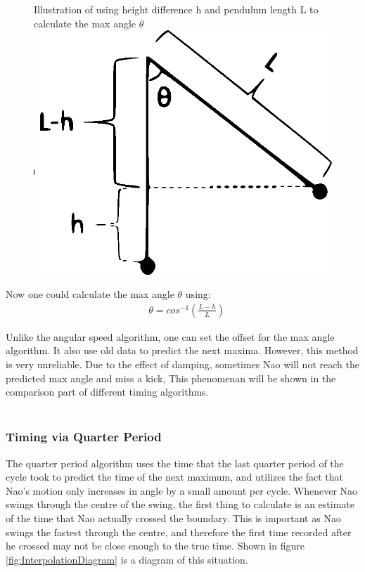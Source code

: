 \documentclass[11pt]{article}
\newcommand*\ruleline[1]{\par\noindent\raisebox{.8ex}{\makebox[\linewidth]{\hrulefill\hspace{1ex}\raisebox{-.8ex}{#1}\hspace{1ex}\hrulefill}}}
\begin{document}
    \begin{figure}[!htb]
        \centering
        \captionbox
             {Illustration of using height difference h and pendulum length L to calculate the max angle $\theta$\label{fig:max_angle_calculation}}
             {\includegraphics[scale = 0.85]{max_angle_calculation.eps}}
    \end{figure}
Now one could calculate the max angle $\theta$ using:
\begin{align}
    &\theta = cos^{-1}(\frac{L-h}{L})
\end{align}

Unlike the angular speed algorithm, one can set the offset for the max angle algorithm. It also use old data to predict the next maxima. However, this method is very unreliable. Due to the effect of damping, sometimes Nao will not reach the predicted max angle and miss a kick, This phenomenan will be shown in the comparison part of different timing algorithms.
\\
\\
\subsubsection{Timing via Quarter Period}
\ruleline{George Sheppard}
The quarter period algorithm uses the time that the last quarter period of the cycle took to predict the time of the next maximum, and utilizes the fact that Nao's motion only increases in angle by a small amount per cycle. Whenever Nao swings through the centre of the swing, the first thing to calculate is an estimate of the time that Nao actually crossed the boundary. This is important as Nao swings the fastest through the centre, and therefore the first time recorded after he crossed may not be close enough to the true time. Shown in figure \ref{fig:InterpolationDiagram} is a diagram of this situation. 
\end{document}
